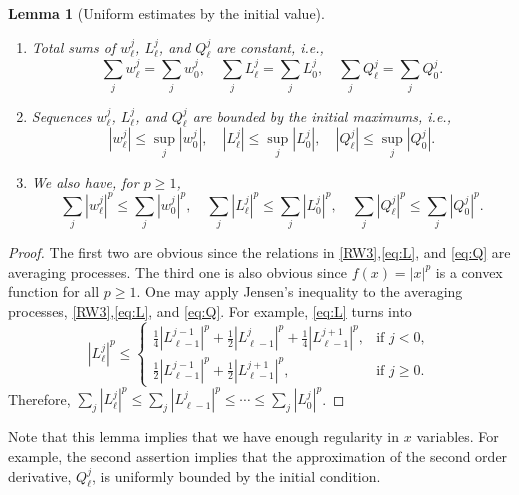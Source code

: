 \documentclass[11pt]{amsart}
\newtheorem{lemma}{Lemma}[section]
\begin{document}
\begin{lemma}[Uniform estimates by the initial value] \label{uniform_est} ~

\begin{enumerate}\item Total sums of $w_\ell^j$, $L_\ell^j$, and
$Q_\ell^j$ are constant, i.e.,
$$
\sum_{j} w^j_\ell = \sum_{j} w^j_0,\quad \sum_{j} L^j_\ell = \sum_{j}
L^j_0,\quad \sum_{j} Q^j_\ell = \sum_{j} Q^j_0.
$$
\item Sequences $w_\ell^j$, $L_\ell^j$, and $Q_\ell^j$ are bounded by the
    initial maximums, i.e.,
  $$
  |w^j_\ell| \le \sup _{j} |w^j_0|,\quad  |L^j_\ell| \le \sup _{j}
  |L^j_0|,\quad |Q^j_\ell| \le \sup _{j} |Q^j_0|.
  $$
\item We also have, for $p\ge1$,
$$
\sum _{j} |w^j_\ell|^p \le \sum _{j} |w^j_0|^p,\quad\sum _{j} |L^j_\ell|^p \le \sum _{j} |L^j_0|^p,\quad \sum _{j} |Q^j_\ell|^p \le
\sum _{j} |Q^j_0|^p.
$$
\end{enumerate}
\end{lemma}
\begin{proof}
The first two are obvious since the relations in \eqref{RW3},\eqref{eq:L}, and \eqref{eq:Q} are averaging processes. The third one is also obvious since $f(x)=|x|^p$ is a convex function for all $p\ge1$. One may apply Jensen's inequality to the averaging processes, \eqref{RW3},\eqref{eq:L}, and \eqref{eq:Q}. For example, \eqref{eq:L} turns into
$$
|L^j_\ell|^p \le \left\{\begin{array}{ll}
        \frac{1}{4}|L_{\ell-1}^{j-1}|^p + \frac{1}{2}|L_{\ell-1}^j|^p +
        \frac{1}{4}|L_{\ell-1}^{j+1}|^p, & \text{if $j<0$},\\
        \frac{1}{2}|L_{\ell-1}^{j-1}|^p + \frac{1}{2}|L_{\ell-1}^{j+1}|^p, &
        \text{if $j\ge0$}.
        \end{array}\right.
$$
Therefore, $\sum _{j} |L^j_\ell|^p \le\sum _{j} |L^j_{\ell-1}|^p\le\cdots\le\sum _{j} |L^j_0|^p$.
\end{proof}

Note that this lemma implies that we have enough regularity in $x$ variables. For example, the second assertion implies that the approximation of the second order derivative, $Q^j_\ell$, is uniformly bounded by the initial condition. 
\end{document}
